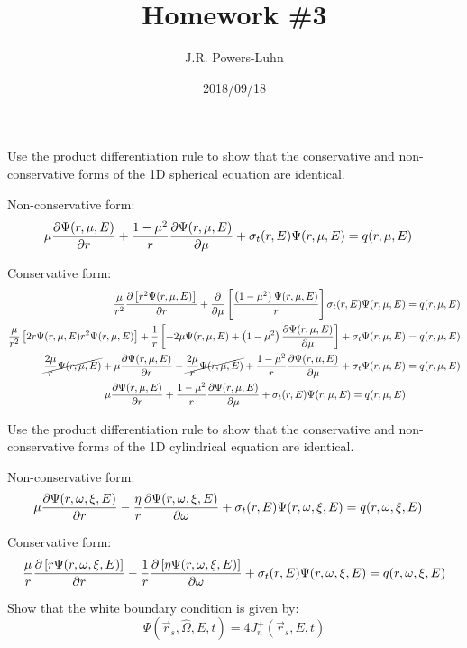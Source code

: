 \documentclass{hw}
\author{J.R. Powers-Luhn}
\date{2018/09/18}
\title{Homework \#3}
\begin{document}
\problem{}
    Use the product differentiation rule to show that the conservative and non-conservative forms of the 1D spherical equation are identical.

\solution
    Non-conservative form:
    \begin{align*}
    	\mu \pdv{\Psi (r, \mu, E)}{r} + \frac{1-\mu^2}{r} \pdv{\Psi (r, \mu, E)}{\mu} +\sigma_t(r, E) \Psi (r, \mu, E) &= q(r, \mu, E)
    \end{align*}

    Conservative form:
    \begin{align*}
    	\frac{\mu}{r^2} \pdv{\left[ r^2 \Psi(r, \mu, E) \right]}{r} + \pdv{}{\mu} \left[ \frac{\left( 1 - \mu^2 \right) \Psi(r, \mu, E)}{r} \right]
    		\sigma_t (r, E) \Psi ( r, \mu, E ) &= q(r, \mu, E) \\
    	\frac{\mu}{r^2} \left[ 2 r \Psi ( r, \mu, E )  r^2 \Psi ( r, \mu, E ) \right] + 
    		\frac{1}{r} \left[ -2 \mu \Psi ( r, \mu, E ) + \left( 1 - \mu^2 \right) \pdv{\Psi ( r, \mu, E )}{\mu} \right] + 
    		\sigma_t \Psi ( r, \mu, E ) &= q(r, \mu, E) \\
    	\cancel{\frac{2 \mu}{r} \Psi ( r, \mu, E )} + \mu \pdv{\Psi ( r, \mu, E )}{r} - \cancel{\frac{2 \mu}{r} \Psi ( r, \mu, E )} +
    		\frac{1 - \mu^2}{r} \pdv{\Psi ( r, \mu, E )}{\mu} + \sigma_t \Psi ( r, \mu, E ) &= q(r, \mu, E) \\
    	\mu \pdv{\Psi (r, \mu, E)}{r} + \frac{1-\mu^2}{r} \pdv{\Psi (r, \mu, E)}{\mu} +\sigma_t(r, E) \Psi (r, \mu, E) = q(r, \mu, E)
    \end{align*}

\problem{}
    Use the product differentiation rule to show that the conservative and non-conservative forms of the 1D cylindrical equation are identical.

\solution
    Non-conservative form:
    \begin{align*}
    	\mu \pdv{\Psi( r, \omega, \xi, E )}{r} - \frac{\eta}{r} \pdv{\Psi( r, \omega, \xi, E )}{\omega} + \sigma_t(r, E) \Psi( r, \omega, \xi, E ) &= q(r, \omega, \xi, E)
    \end{align*}

    Conservative form:
    \begin{align*}
    	\frac{\mu}{r} \pdv{\left[ r \Psi( r, \omega, \xi, E ) \right]}{r} - \frac{1}{r} \pdv{\left[ \eta \Psi( r, \omega, \xi, E ) \right]}{\omega} +
    		\sigma_t ( r, E ) \Psi( r, \omega, \xi, E ) &= q(r, \omega, \xi, E) \\
    	
    \end{align*}

\problem{}
    Show that the white boundary condition is given by: $$ \Psi(\vec{r}_s, \hat{\Omega}, E, t) = 4 J^+_n(\vec{r}_s, E, t) $$

\solution
    
\end{document}
